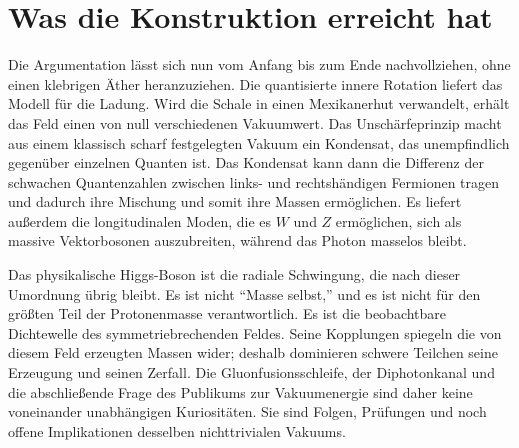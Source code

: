 \begin{classroomqa}
\end{classroomqa}

\begin{classroomqa}
\end{classroomqa}

\section{Was die Konstruktion erreicht hat}

Die Argumentation lässt sich nun vom Anfang bis zum Ende nachvollziehen, ohne einen klebrigen Äther heranzuziehen. Die quantisierte innere Rotation liefert das Modell für die Ladung. Wird die Schale in einen Mexikanerhut verwandelt, erhält das Feld einen von null verschiedenen Vakuumwert. Das Unschärfeprinzip macht aus einem klassisch scharf festgelegten Vakuum ein Kondensat, das unempfindlich gegenüber einzelnen Quanten ist. Das Kondensat kann dann die Differenz der schwachen Quantenzahlen zwischen links- und rechtshändigen Fermionen tragen und dadurch ihre Mischung und somit ihre Massen ermöglichen. Es liefert außerdem die longitudinalen Moden, die es $W$ und $Z$ ermöglichen, sich als massive Vektorbosonen auszubreiten, während das Photon masselos bleibt.

Das physikalische Higgs-Boson ist die radiale Schwingung, die nach dieser Umordnung übrig bleibt. Es ist nicht ``Masse selbst,'' und es ist nicht für den größten Teil der Protonenmasse verantwortlich. Es ist die beobachtbare Dichtewelle des symmetriebrechenden Feldes. Seine Kopplungen spiegeln die von diesem Feld erzeugten Massen wider; deshalb dominieren schwere Teilchen seine Erzeugung und seinen Zerfall. Die Gluonfusionsschleife, der Diphotonkanal und die abschließende Frage des Publikums zur Vakuumenergie sind daher keine voneinander unabhängigen Kuriositäten. Sie sind Folgen, Prüfungen und noch offene Implikationen desselben nichttrivialen Vakuums.
